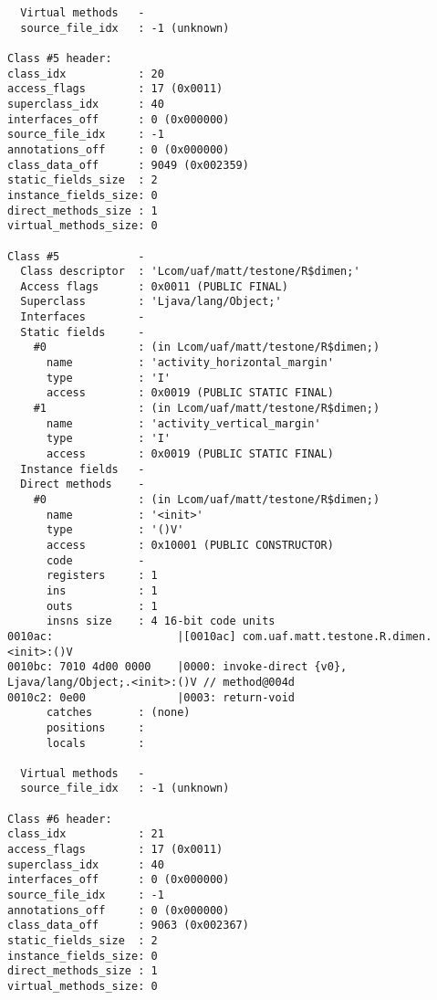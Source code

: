 \begin{lstlisting}
  Virtual methods   -
  source_file_idx   : -1 (unknown)

Class #5 header:
class_idx           : 20
access_flags        : 17 (0x0011)
superclass_idx      : 40
interfaces_off      : 0 (0x000000)
source_file_idx     : -1
annotations_off     : 0 (0x000000)
class_data_off      : 9049 (0x002359)
static_fields_size  : 2
instance_fields_size: 0
direct_methods_size : 1
virtual_methods_size: 0

Class #5            -
  Class descriptor  : 'Lcom/uaf/matt/testone/R$dimen;'
  Access flags      : 0x0011 (PUBLIC FINAL)
  Superclass        : 'Ljava/lang/Object;'
  Interfaces        -
  Static fields     -
    #0              : (in Lcom/uaf/matt/testone/R$dimen;)
      name          : 'activity_horizontal_margin'
      type          : 'I'
      access        : 0x0019 (PUBLIC STATIC FINAL)
    #1              : (in Lcom/uaf/matt/testone/R$dimen;)
      name          : 'activity_vertical_margin'
      type          : 'I'
      access        : 0x0019 (PUBLIC STATIC FINAL)
  Instance fields   -
  Direct methods    -
    #0              : (in Lcom/uaf/matt/testone/R$dimen;)
      name          : '<init>'
      type          : '()V'
      access        : 0x10001 (PUBLIC CONSTRUCTOR)
      code          -
      registers     : 1
      ins           : 1
      outs          : 1
      insns size    : 4 16-bit code units
0010ac:                   |[0010ac] com.uaf.matt.testone.R.dimen.<init>:()V
0010bc: 7010 4d00 0000    |0000: invoke-direct {v0}, Ljava/lang/Object;.<init>:()V // method@004d
0010c2: 0e00              |0003: return-void
      catches       : (none)
      positions     :
      locals        :

  Virtual methods   -
  source_file_idx   : -1 (unknown)

Class #6 header:
class_idx           : 21
access_flags        : 17 (0x0011)
superclass_idx      : 40
interfaces_off      : 0 (0x000000)
source_file_idx     : -1
annotations_off     : 0 (0x000000)
class_data_off      : 9063 (0x002367)
static_fields_size  : 2
instance_fields_size: 0
direct_methods_size : 1
virtual_methods_size: 0


\end{lstlisting}

